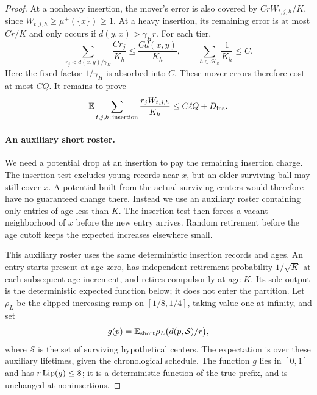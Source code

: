 \begin{proof}
At a nonheavy insertion, the mover's error is also covered by
\(CrW_{t,j,h}/K\), since \(W_{t,j,h}\ge\mu^+(\{x\})\ge1\).
At a heavy insertion, its remaining error is at most \(Cr/K\) and
only occurs if \(d(y,x)>\gamma_Hr\).  For each tier,
\[
 \sum_{r_j<d(x,y)/\gamma_H}\frac{Cr_j}{K_h}
 \le\frac{C d(x,y)}{K_h},\qquad
 \sum_{h\in\mathcal H_k}\frac1{K_h}\le C.
\]
Here the fixed factor \(1/\gamma_H\) is absorbed into \(C\).
These mover errors therefore cost at most \(CQ\).  It remains to prove
\begin{equation}\label{eq:insertion-charge-budget}
 \mathbb E\sum_{t,j,h:\,\text{insertion}}\frac{r_jW_{t,j,h}}{K_h}
 \le C\ell Q+D_{\mathrm{ins}}.
\end{equation}

\paragraph{An auxiliary short roster.}
We need a potential drop at an insertion to pay the remaining insertion charge.
The insertion test excludes young records near $x$, but an older surviving
ball may still cover $x$.  A potential built from the actual surviving
centers would therefore have no guaranteed change there.  Instead we use
an auxiliary roster containing only entries of age less than $K$.
The insertion test then forces a vacant neighborhood of $x$ before the
new entry arrives.  Random retirement before the age cutoff keeps the
expected increases elsewhere small.

This auxiliary roster uses the same deterministic insertion records and
ages.  An entry starts present at
age zero, has independent retirement probability \(1/\sqrt K\) at
each subsequent age increment, and retires compulsorily at age \(K\).
Its sole output is the deterministic expected function below; it does
not enter the partition.  Let \(\rho_L\) be the clipped increasing ramp on
\([1/8,1/4]\), taking value one at infinity, and set
\begin{equation}\label{eq:short-roster-g}
 g(p)=\mathbb E_{\rm short}
       \rho_L\bigl(d(p,\mathcal S)/r\bigr),
\end{equation}
where \(\mathcal S\) is the set of surviving hypothetical centers.
The expectation is over these auxiliary lifetimes, given the
chronological schedule.  The function \(g\) lies in \([0,1]\) and
has \(r\operatorname{Lip}(g)\le8\); it is a deterministic function of the true
prefix, and is unchanged at noninsertions.


\end{proof}

